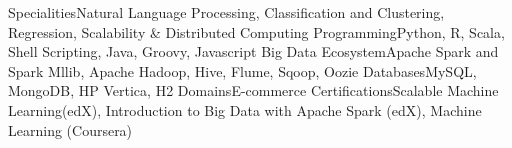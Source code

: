 \begin{cvskills}
\cvskill
{Specialities}{Natural Language Processing, Classification and Clustering, Regression, Scalability \& Distributed Computing}
\cvskill
{Programming}{Python, R, Scala, Shell Scripting, Java, Groovy, Javascript}
\cvskill
{Big Data Ecosystem}{Apache Spark and Spark Mllib, Apache Hadoop, Hive, Flume, Sqoop, Oozie}
\cvskill
{Databases}{MySQL, MongoDB, HP Vertica, H2}
\cvskill
{Domains}{E-commerce}
\cvskill
{Certifications}{Scalable Machine Learning(edX), Introduction to Big Data with Apache Spark (edX), Machine Learning (Coursera)}
\end{cvskills}
